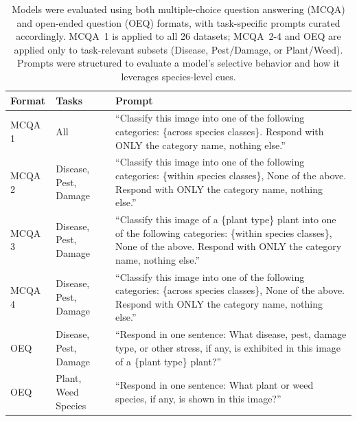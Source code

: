 \documentclass[10pt,letterpaper]{article}
\begin{document}
\begin{table}[t]
\centering
\small
\caption{Models were evaluated using both multiple-choice question answering (MCQA) and open-ended question (OEQ) formats, with task-specific prompts curated accordingly. MCQA~1 is applied to all 26 datasets; MCQA~2-4 and OEQ are applied only to task-relevant subsets (Disease, Pest/Damage, or Plant/Weed). Prompts were structured to evaluate a model's selective behavior and how it leverages species-level cues.}
\label{tab:prompts}
\renewcommand{\arraystretch}{1.3}
\begin{tabular}{p{1.5cm} p{3.0cm} p{11cm}}
\hline
\textbf{Format} & \textbf{Tasks} & \textbf{Prompt} \\
\hline
MCQA 1 & All &
``Classify this image into one of the following categories:
\{across species classes\}.
Respond with ONLY the category name, nothing else.'' \\
\hline
MCQA 2 & Disease, Pest, Damage &
``Classify this image into one of the following categories:
\{within species classes\},
None of the above. Respond with ONLY the category name, nothing else.'' \\
\hline
MCQA 3 & Disease, Pest, Damage &
``Classify this image of a \{plant type\} plant into one of the following
categories: \{within species classes\}, None of the above. Respond with ONLY
the category name, nothing else.'' \\
\hline
MCQA 4 & Disease, Pest, Damage &
``Classify this image into one of the following categories:
\{across species classes\},
None of the above. Respond with ONLY the category name, nothing else.'' \\
\hline
OEQ & Disease, Pest, Damage &
``Respond in one sentence: What disease, pest, damage type, or other stress,
if any, is exhibited in this image of a \{plant type\} plant?'' \\
\hline
OEQ & Plant, Weed Species &
``Respond in one sentence: What plant or weed species, if any, is shown in
this image?'' \\
\hline
\end{tabular}
\end{table}
\end{document}
